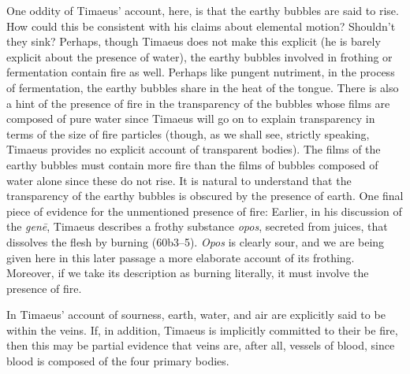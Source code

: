 One oddity of Timaeus' account, here, is that the earthy bubbles are said to rise. How could this be consistent with his claims about elemental motion? Shouldn't they sink? Perhaps, though Timaeus does not make this explicit (he is barely explicit about the presence of water), the earthy bubbles involved in frothing or fermentation contain fire as well. Perhaps like pungent nutriment, in the process of fermentation, the earthy bubbles share in the heat of the tongue. There is also a hint of the presence of fire in the transparency of the bubbles whose films are composed of pure water since Timaeus will go on to explain transparency in terms of the size of fire particles (though, as we shall see, strictly speaking, Timaeus provides no explicit account of transparent bodies). The films of the earthy bubbles must contain more fire than the films of bubbles composed of water alone since these do not rise. It is natural to understand that the transparency of the earthy bubbles is obscured by the presence of earth. One final piece of evidence for the unmentioned presence of fire: Earlier, in his discussion of the \emph{genē}, Timaeus describes a frothy substance \emph{opos}, secreted from juices, that dissolves the flesh by burning (60b3--5). \emph{Opos} is clearly sour, and we are being given here in this later passage a more elaborate account of its frothing. Moreover, if we take its description as burning literally, it must involve the presence of fire.

In Timaeus' account of sourness, earth, water, and air are explicitly said to be within the veins. If, in addition, Timaeus is implicitly committed to their be fire, then this may be partial evidence that veins are, after all, vessels of blood, since blood is composed of the four primary bodies.

